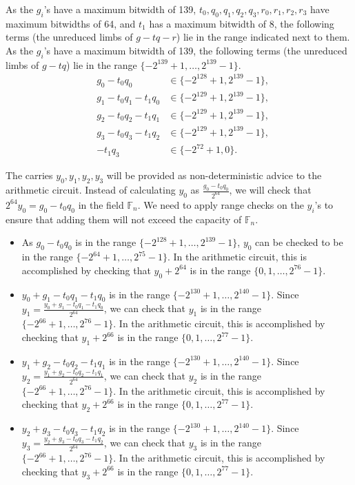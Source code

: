 \documentclass[a4paper, 12pt]{article}
\begin{document}
As the $g_i$'s have a maximum bitwidth of 139, $t_0, q_0, q_1, q_2, q_3, r_0, r_1, r_2, r_3$ have maximum bitwidths of 64, and $t_1$ has a maximum bitwidth of 8, the following terms (the unreduced limbs of $g-tq-r$) lie in the range indicated next to them.
As the $g_i$'s have a maximum bitwidth of 139, the following terms (the unreduced limbs of $g-tq$) lie in the range $\{-2^{139}+1,\ldots, 2^{139}-1\}$.
\begin{align*}
  & g_0 - t_0q_0 & \in \{-2^{128}+1, 2^{139}-1\},\\
  & g_1 - t_0q_1-t_1q_0 & \in \{-2^{129}+1, 2^{139}-1\},\\
  & g_2 - t_0q_2-t_1q_1 & \in \{-2^{129}+1, 2^{139}-1\},\\
  & g_3 -  t_0q_3-t_1q_2 & \in \{-2^{129}+1, 2^{139}-1\},\\
  & - t_1q_3 & \in \{-2^{72}+1, 0\}.
\end{align*}


The carries $y_0,y_1,y_2,y_3$ will be provided as non-deterministic advice to the arithmetic circuit. Instead of calculating $y_0$ as $\frac{g_0-t_0q_0}{2^{64}}$, we will check that $2^{64}y_0 = g_0-t_0q_0$ in the field $\mathbb{F}_n$. We need to apply range checks on the $y_i$'s to ensure that adding them will not exceed the capacity of $\mathbb{F}_n$.

\begin{itemize}
  \item As $g_0 - t_0q_0$ is in the range $\{-2^{128}+1,\ldots, 2^{139}-1\}$, $y_0$ can be checked to be in the range $\{-2^{64}+1,\ldots, 2^{75}-1\}$. In the arithmetic circuit, this is accomplished by checking that $y_0 + 2^{64}$ is in the range $\{0,1,\ldots,2^{76}-1\}$.
  \item $y_0+g_1-t_0q_1-t_1q_0$ is in the range $\{-2^{130}+1,\ldots, 2^{140}-1\}$. Since $y_1 = \frac{y_0+g_1-t_0q_1-t_1q_0}{2^{64}}$, we can check that $y_1$ is in the range $\{-2^{66}+1,\ldots, 2^{76}-1\}$. In the arithmetic circuit, this is accomplished by checking that $y_1 + 2^{66}$ is in the range $\{0,1,\ldots,2^{77}-1\}$.
  \item $y_1+g_2-t_0q_2-t_1q_1$ is in the range $\{-2^{130}+1,\ldots, 2^{140}-1\}$. Since $y_2 = \frac{y_1+g_2-t_0q_2-t_1q_1}{2^{64}}$, we can check that $y_2$ is in the range $\{-2^{66}+1,\ldots, 2^{76}-1\}$. In the arithmetic circuit, this is accomplished by checking that $y_2 + 2^{66}$ is in the range $\{0,1,\ldots,2^{77}-1\}$.
  \item $y_2+g_3-t_0q_3-t_1q_2$ is in the range $\{-2^{130}+1,\ldots, 2^{140}-1\}$. Since $y_3 = \frac{y_2+g_3-t_0q_3-t_1q_2}{2^{64}}$, we can check that $y_3$ is in the range $\{-2^{66}+1,\ldots, 2^{76}-1\}$. In the arithmetic circuit, this is accomplished by checking that $y_3 + 2^{66}$ is in the range $\{0,1,\ldots,2^{77}-1\}$.
\end{itemize}
\end{document}
